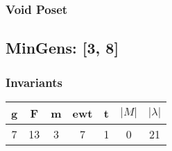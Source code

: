 \documentclass[a4paper]{article}
\begin{document}
\hfill\begin{minipage}{0.48\textwidth}
\subsubsection*{Void Poset}
\centering
{}
\end{minipage}
\newpage\subsection{MinGens: [3, 8]}
\noindent\begin{minipage}{0.6\textwidth}
\subsubsection*{Invariants}
\centering
\begin{tabular}{|c|c|c|c|c|c|c|}
\toprule
g & F & m & ewt & t & \(|M|\) & \(|\lambda|\) \\
\midrule
7 & 13 & 3 & 7 & 1 & 0 & 21 \\
\bottomrule
\end{tabular}
\end{minipage}%
\end{document}
